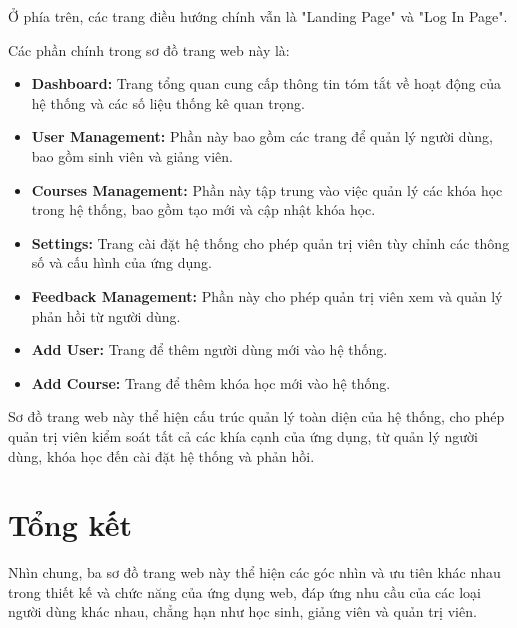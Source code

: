 \par Ở phía trên, các trang điều hướng chính vẫn là "Landing Page" và "Log In Page".

\par Các phần chính trong sơ đồ trang web này là:

\begin{itemize}
    \item \textbf{Dashboard:} Trang tổng quan cung cấp thông tin tóm tắt về hoạt động của hệ thống và các số liệu thống kê quan trọng.
    \item \textbf{User Management:} Phần này bao gồm các trang để quản lý người dùng, bao gồm sinh viên và giảng viên.
    \item \textbf{Courses Management:} Phần này tập trung vào việc quản lý các khóa học trong hệ thống, bao gồm tạo mới và cập nhật khóa học.
    \item \textbf{Settings:} Trang cài đặt hệ thống cho phép quản trị viên tùy chỉnh các thông số và cấu hình của ứng dụng.
    \item \textbf{Feedback Management:} Phần này cho phép quản trị viên xem và quản lý phản hồi từ người dùng.
    \item \textbf{Add User:} Trang để thêm người dùng mới vào hệ thống.
    \item \textbf{Add Course:} Trang để thêm khóa học mới vào hệ thống.
\end{itemize}

\par Sơ đồ trang web này thể hiện cấu trúc quản lý toàn diện của hệ thống, cho phép quản trị viên kiểm soát tất cả các khía cạnh của ứng dụng, từ quản lý người dùng, khóa học đến cài đặt hệ thống và phản hồi.
\section*{Tổng kết}

Nhìn chung, ba sơ đồ trang web này thể hiện các góc nhìn và ưu tiên khác nhau trong thiết kế và chức năng của ứng dụng web, đáp ứng nhu cầu của các loại người dùng khác nhau, chẳng hạn như học sinh, giảng viên và quản trị viên.